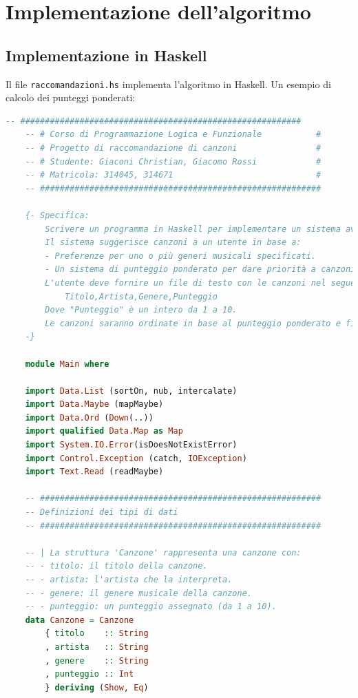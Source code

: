 \documentclass[a4paper,11pt]{article}
\begin{document}
\section{Implementazione dell'algoritmo}
\subsection{Implementazione in Haskell}
Il file \texttt{raccomandazioni.hs} implementa l'algoritmo in Haskell. Un esempio di calcolo dei punteggi ponderati:
\begin{lstlisting}[language=Haskell]
    -- #########################################################
    -- # Corso di Programmazione Logica e Funzionale           #
    -- # Progetto di raccomandazione di canzoni                #
    -- # Studente: Giaconi Christian, Giacomo Rossi            #
    -- # Matricola: 314045, 314671                             #
    -- #########################################################
    
    {- Specifica:
        Scrivere un programma in Haskell per implementare un sistema avanzato di raccomandazione di canzoni.
        Il sistema suggerisce canzoni a un utente in base a:
        - Preferenze per uno o più generi musicali specificati.
        - Un sistema di punteggio ponderato per dare priorità a canzoni più rilevanti.
        L'utente deve fornire un file di testo con le canzoni nel seguente formato:
            Titolo,Artista,Genere,Punteggio
        Dove "Punteggio" è un intero da 1 a 10.
        Le canzoni saranno ordinate in base al punteggio ponderato e filtrate per genere.
    -}
    
    module Main where
    
    import Data.List (sortOn, nub, intercalate)
    import Data.Maybe (mapMaybe)
    import Data.Ord (Down(..))
    import qualified Data.Map as Map
    import System.IO.Error(isDoesNotExistError)
    import Control.Exception (catch, IOException)
    import Text.Read (readMaybe)
    
    -- #########################################################
    -- Definizioni dei tipi di dati
    -- #########################################################
    
    -- | La struttura 'Canzone' rappresenta una canzone con:
    -- - titolo: il titolo della canzone.
    -- - artista: l'artista che la interpreta.
    -- - genere: il genere musicale della canzone.
    -- - punteggio: un punteggio assegnato (da 1 a 10).
    data Canzone = Canzone
        { titolo    :: String
        , artista   :: String
        , genere    :: String
        , punteggio :: Int
        } deriving (Show, Eq)
    

\end{lstlisting}
\end{document}
